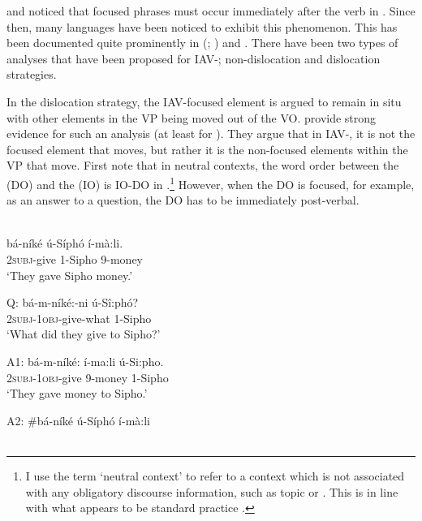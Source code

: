 \documentclass[output=paper,newtxmath,modfonts,nonflat,hidelinks]{langsci/langscibook}
\begin{document}
\citet{hyman1979nounstructure} and \citet{watters1979} noticed that focused phrases must occur immediately after the verb in . Since then, many  languages have been noticed to exhibit this phenomenon. This has been documented quite prominently in  (\citealt{Buell2009}; \citealt{chengdowning2012}) and  \citep{vanderwal2006}. There have been two types of analyses that have been proposed for IAV-; non-dislocation and dislocation strategies. 

In the dislocation strategy, the IAV-focused element is argued to remain in situ with other elements in the VP being moved out of the VO. \citet{chengdowning2012} provide strong evidence for such an analysis (at least for ). They argue that in  IAV-, it is not the focused element that moves, but rather it is the non-focused elements within the VP that move. First note that in neutral contexts, the word order between the  (DO) and the  (IO) is IO-DO in .\footnote{I use the term ‘neutral context’ to refer to a context which is not associated with any obligatory discourse information, such as topic or . This is in line with what appears to be standard practice \citep{Diercks2013,diercks2015}.}  However, when the DO is focused, for example, as an answer to a question, the DO has to be immediately post-verbal.

\settowidth{}
\ea\label{ex:selvanathan:1}
 \citep[2]{chengdowning2012}\\

\ea\label{ex:selvanathan:1a}
{\gll bá-níké   ú-Síphó  í-mà:li.       \\
\textsc{2subj}{}-give  1-Sipho     9-money {} \\}
\glt `They gave Sipho money.' 

\ex\label{ex:selvanathan:1b}
	Q:
	\gll bá-m-níké:-ni      ú-Sî:phó? \\
	\textsc{2subj}{}-\textsc{1obj}{}-give-what    1-Sipho \\
	\glt `What did they give to Sipho?'

	A1: 
	{\gll bá-m-níké:      í-ma:li   ú-Si:pho.    \\
	\textsc{2subj}{}-\textsc{1obj}{}-give   9-money   1-Sipho \\}
	\glt `They gave money to Sipho.'

	A2:
	{\gll \#bá-níké   ú-Síphó  í-mà:li     \\
	\\}
\z
\z
\end{document}
